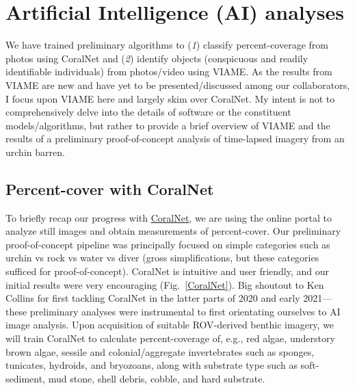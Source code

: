 \documentclass[11pt]{article}
\begin{document}
\section{Artificial Intelligence (AI) analyses}
We have trained preliminary algorithms to (\textit{1}) classify 
percent-coverage from photos using CoralNet and (\textit{2}) identify 
objects (conspicuous and readily identifiable individuals) from 
photos/video using VIAME. 
As the results from VIAME are new and have yet to be 
presented/discussed among our collaborators, I focus upon VIAME here 
and largely skim over CoralNet. 
My intent is not to comprehensively delve into the details of software 
or the constituent models/algorithms, but rather to provide a brief 
overview of VIAME and the results of a preliminary proof-of-concept 
analysis of time-lapsed imagery from an urchin barren. 

\subsection{Percent-cover with CoralNet}
To briefly recap our progress with 
\href{https://coralnet.ucsd.edu/about/}{CoralNet}, we are using the 
online portal to analyze still images and obtain measurements of 
percent-cover. 
Our preliminary proof-of-concept pipeline was principally focused on 
simple categories such as urchin vs rock vs water vs diver (gross 
simplifications, but these categories sufficed for proof-of-concept). 
CoralNet is intuitive and user friendly, and our initial results were 
very encouraging (Fig.~\ref{CoralNet}). 
Big shoutout to Ken Collins for first tackling CoralNet in the latter 
parts of 2020 and early 2021---these preliminary analyses were 
instrumental to first orientating ourselves to AI image analysis.  
Upon acquisition of suitable ROV-derived benthic imagery, we will train 
CoralNet to calculate percent-coverage of, e.g., red algae, understory 
brown algae, sessile and colonial/aggregate invertebrates such as 
sponges, tunicates, hydroids, and bryozoans, along with substrate type 
such as soft-sediment, mud stone, shell debris, cobble, and hard 
substrate.
\end{document}
